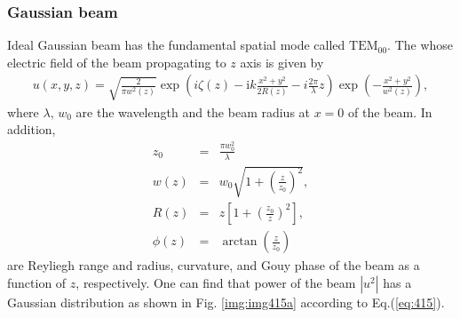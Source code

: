 \subsubsection{Gaussian beam}
Ideal Gaussian beam has the fundamental spatial mode called $\mathrm{TEM}_{00}$. The whose electric field of the beam propagating to $z$ axis is given by \cite{bond2016interferometer,svelto1998principles}
\begin{eqnarray}
  u(x, y, z)=\sqrt{\frac{2}{\pi{w^2(z)}}} \exp \left(i\zeta(z)-\mathrm{i} k \frac{x^{2} +y^{2}}{2 R(z)}-i\frac{2\pi}{\lambda}z\right)
  \exp \left(-\frac{x^{2}+y^{2}}{w^{2}(z)}\right),  \label{eq:eq415}
\end{eqnarray}
where $\lambda,\,w_0$ are the wavelength and the beam radius at $x=0$ of the beam. In addition,
\begin{eqnarray}
  z_0 &=& \frac{\pi{w^2_0}}{\lambda} \\ \label{eq:eq415_a}
  w(z) &=& w_0\sqrt{1+\left(\frac{z}{z_0}\right)^2}, \\ \label{eq:eq415_b}
  R(z) &=& z\left[1+\left(\frac{z_0}{z}\right)^2\right],\\ \label{eq:eq415_c}
  \phi(z) &=& \arctan\left(\frac{z}{z_0}\right) \label{eq:eq415_d}
\end{eqnarray}
are Reyliegh range and radius, curvature, and Gouy phase of the beam as a function of $z$, respectively. One can find that power of the beam $|u^2|$ has a Gaussian distribution as shown in Fig. \ref{img:img415a} according to Eq.(\ref{eq:415}). 

